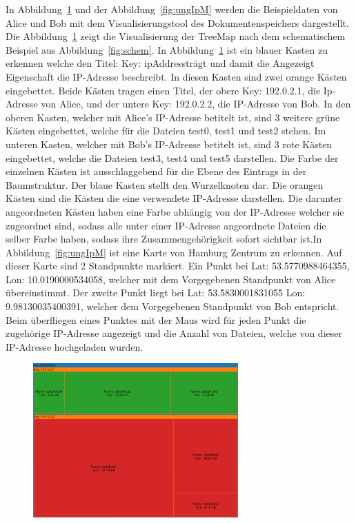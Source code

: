 \documentclass[
    fontsize=12pt,
    headings=small,
    parskip=half,           %
    bibliography=totoc,
    numbers=noenddot,       %
    open=any,               %
    ]{scrreprt}
\begin{document}
In Abbildung~\ref{fig:ungIpTM} und der Abbildung~\ref{fig:ungIpM} werden die Beispieldaten von Alice und Bob mit dem Visualisierungstool des Dokumentenspeichers dargestellt.
Die Abbildung~\ref{fig:ungIpTM} zeigt die Visualisierung der TreeMap nach dem schematischem Beispiel aus Abbildung~\ref{fig:schem}. 
In Abbildung~\ref{fig:ungIpTM} ist ein blauer Kasten zu erkennen welche den Titel: \glqq Key: ipAddress\grqq trägt und damit die Angezeigt Eigenschaft die IP-Adresse beschreibt.
In diesen Kasten sind zwei orange Kästen eingebettet.
Beide Kästen tragen einen Titel, der obere \glqq Key: 192.0.2.1\grqq, die Ip-Adresse von Alice, und der untere \glqq Key: 192.0.2.2\grqq, die IP-Adresse von Bob.
In den oberen Kasten, welcher mit Alice's IP-Adresse betitelt ist, sind 3 weitere grüne Kästen eingebettet, welche für die Dateien test0, test1 und test2 stehen.
Im unteren Kasten, welcher mit Bob's IP-Adresse betitelt ist, sind 3 rote Kästen eingebettet, welche die Dateien test3, test4 und test5 darstellen.
Die Farbe der einzelnen Kästen ist ausschlaggebend für die Ebene des Eintrags in der Baumstruktur.
Der blaue Kasten stellt den Wurzelknoten dar.
Die orangen Kästen sind die Kästen die eine verwendete IP-Adresse darstellen.
Die darunter angeordneten Kästen haben eine Farbe abhängig von der IP-Adresse welcher sie zugeordnet sind, sodass alle unter einer IP-Adresse angeordnete Dateien die selber Farbe haben, sodass ihre Zusammengehörigkeit sofort sichtbar ist.In Abbildung~\ref{fig:ungIpM} ist eine Karte von Hamburg Zentrum zu erkennen.
Auf dieser Karte sind 2 Standpunkte markiert.
Ein Punkt bei Lat: 53.5770988464355, Lon: 10.0190000534058, welcher mit dem Vorgegebenen Standpunkt von Alice übereinstimmt.
Der zweite Punkt liegt bei Lat: 53.5830001831055 Lon: 9.98130035400391, welcher dem Vorgegebenen Standpunkt von Bob entspricht.
Beim überfliegen eines Punktes mit der Maus wird für jeden Punkt die zugehörige IP-Adresse angezeigt und die Anzahl von Dateien, welche von dieser IP-Adresse hochgeladen wurden.

\begin{figure}[H]
\includegraphics[width=0.7\textwidth]{../pic/vec/IP-Proxy-SetA-tree3.PNG}
\label{fig:ungIpTM}
\end{figure}
\end{document}
